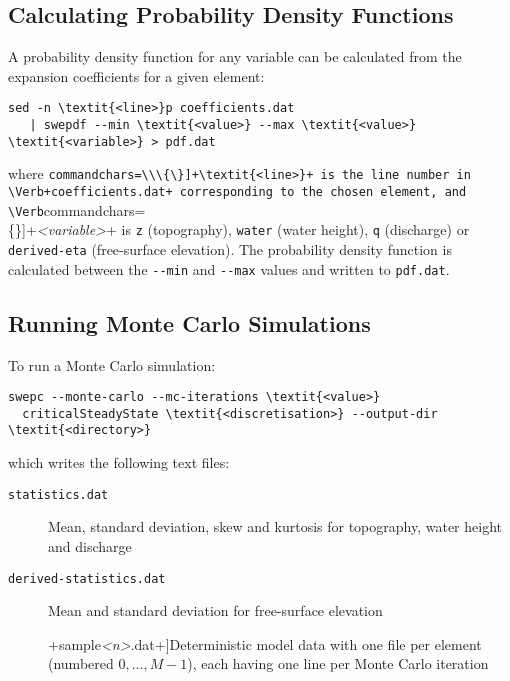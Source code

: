 \subsection{Calculating Probability Density Functions}
A probability density function for any variable can be calculated from the expansion coefficients for a given element:
\begin{Verbatim}[commandchars=\\\{\}]
sed -n \textit{<line>}p coefficients.dat
   | swepdf --min \textit{<value>} --max \textit{<value>} \textit{<variable>} > pdf.dat
\end{Verbatim}
where \Verb[commandchars=\\\{\}]+\textit{<line>}+ is the line number in \Verb+coefficients.dat+ corresponding to the chosen element, and \Verb[commandchars=\\\{\}]+\textit{<variable>}+ is \Verb+z+ (topography), \Verb+water+ (water height), \Verb+q+ (discharge) or \Verb+derived-eta+ (free-surface elevation).
The probability density function is calculated between the \Verb+--min+ and \Verb+--max+ values and written to \Verb+pdf.dat+. 

\subsection{Running Monte Carlo Simulations}
To run a Monte Carlo simulation:
\begin{Verbatim}[commandchars=\\\{\}]
swepc --monte-carlo --mc-iterations \textit{<value>}
  criticalSteadyState \textit{<discretisation>} --output-dir \textit{<directory>}
\end{Verbatim}
which writes the following text files:
\begin{description}
\item[\Verb+statistics.dat+]{Mean, standard deviation, skew and kurtosis for topography, water height and discharge}
\item[\Verb+derived-statistics.dat+]{Mean and standard deviation for free-surface elevation}
\cprotect\item[\Verb[commandchars=\\\{\}]+sample\textit{<n>}.dat+]{Deterministic model data with one file per element (numbered $0, \ldots, M-1$), each having one line per Monte Carlo iteration}
\end{description}